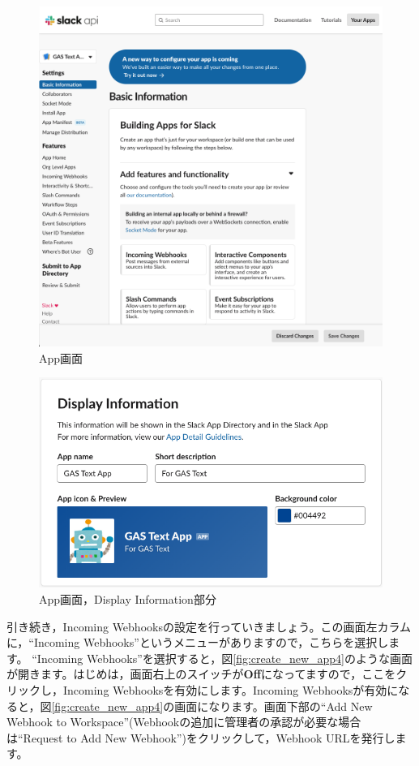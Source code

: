 \documentclass[uplatex,a4j]{jsarticle}
\begin{document}
\begin{figure}[H]
 \centering
 \includegraphics[keepaspectratio, scale=0.4]{images/create_new_app3.png}
 \caption{App画面}
 \label{fig:create_new_app3}
\end{figure}

\begin{figure}[H]
 \centering
 \includegraphics[keepaspectratio, scale=0.5]{images/create_new_app5.png}
 \caption{App画面，Display Information部分}
 \label{fig:create_new_app5}
\end{figure}

引き続き，Incoming Webhooksの設定を行っていきましょう。この画面左カラムに，``Incoming Webhooks''というメニューがありますので，こちらを選択します。
``Incoming Webhooks''を選択すると，図\ref{fig:create_new_app4}のような画面が開きます。はじめは，画面右上のスイッチが\textbf{Off}になってますので，ここをクリックし，Incoming Webhooksを有効にします。Incoming Webhooksが有効になると，図\ref{fig:create_new_app4}の画面になります。画面下部の``Add New Webhook to Workspace''(Webhookの追加に管理者の承認が必要な場合は``Request to Add New Webhook'')をクリックして，Webhook URLを発行します。
\end{document}
